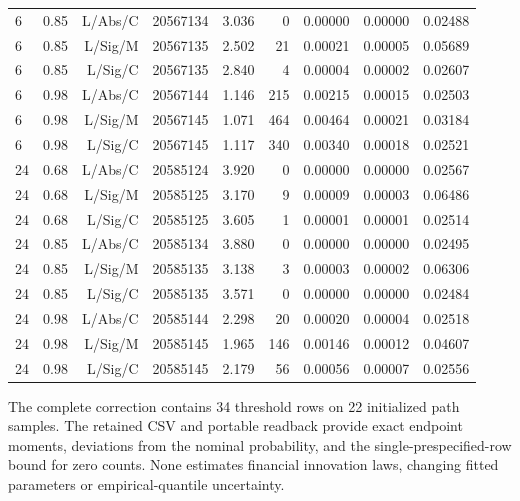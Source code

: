 \begin{longtable}{lrrrrrrrr}
6 & 0.85 & L/Abs/C & 20567134 & 3.036 & 0 & 0.00000 & 0.00000 & 0.02488 \\
6 & 0.85 & L/Sig/M & 20567135 & 2.502 & 21 & 0.00021 & 0.00005 & 0.05689 \\
6 & 0.85 & L/Sig/C & 20567135 & 2.840 & 4 & 0.00004 & 0.00002 & 0.02607 \\
6 & 0.98 & L/Abs/C & 20567144 & 1.146 & 215 & 0.00215 & 0.00015 & 0.02503 \\
6 & 0.98 & L/Sig/M & 20567145 & 1.071 & 464 & 0.00464 & 0.00021 & 0.03184 \\
6 & 0.98 & L/Sig/C & 20567145 & 1.117 & 340 & 0.00340 & 0.00018 & 0.02521 \\
24 & 0.68 & L/Abs/C & 20585124 & 3.920 & 0 & 0.00000 & 0.00000 & 0.02567 \\
24 & 0.68 & L/Sig/M & 20585125 & 3.170 & 9 & 0.00009 & 0.00003 & 0.06486 \\
24 & 0.68 & L/Sig/C & 20585125 & 3.605 & 1 & 0.00001 & 0.00001 & 0.02514 \\
24 & 0.85 & L/Abs/C & 20585134 & 3.880 & 0 & 0.00000 & 0.00000 & 0.02495 \\
24 & 0.85 & L/Sig/M & 20585135 & 3.138 & 3 & 0.00003 & 0.00002 & 0.06306 \\
24 & 0.85 & L/Sig/C & 20585135 & 3.571 & 0 & 0.00000 & 0.00000 & 0.02484 \\
24 & 0.98 & L/Abs/C & 20585144 & 2.298 & 20 & 0.00020 & 0.00004 & 0.02518 \\
24 & 0.98 & L/Sig/M & 20585145 & 1.965 & 146 & 0.00146 & 0.00012 & 0.04607 \\
24 & 0.98 & L/Sig/C & 20585145 & 2.179 & 56 & 0.00056 & 0.00007 & 0.02556 \\
\end{longtable}
\endgroup

The complete correction contains 34 threshold rows on 22 initialized path samples.
The retained CSV and portable readback provide exact endpoint moments,
deviations from the nominal probability, and the single-prespecified-row bound
for zero counts. None estimates financial innovation laws, changing fitted
parameters or empirical-quantile uncertainty.